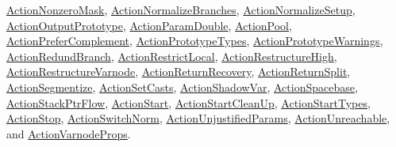 \mbox{\hyperlink{class_action_nonzero_mask}{Action\+Nonzero\+Mask}}, \mbox{\hyperlink{class_action_normalize_branches}{Action\+Normalize\+Branches}}, \mbox{\hyperlink{class_action_normalize_setup}{Action\+Normalize\+Setup}}, \mbox{\hyperlink{class_action_output_prototype}{Action\+Output\+Prototype}}, \mbox{\hyperlink{class_action_param_double}{Action\+Param\+Double}}, \mbox{\hyperlink{class_action_pool}{Action\+Pool}}, \mbox{\hyperlink{class_action_prefer_complement}{Action\+Prefer\+Complement}}, \mbox{\hyperlink{class_action_prototype_types}{Action\+Prototype\+Types}}, \mbox{\hyperlink{class_action_prototype_warnings}{Action\+Prototype\+Warnings}}, \mbox{\hyperlink{class_action_redund_branch}{Action\+Redund\+Branch}}, \mbox{\hyperlink{class_action_restrict_local}{Action\+Restrict\+Local}}, \mbox{\hyperlink{class_action_restructure_high}{Action\+Restructure\+High}}, \mbox{\hyperlink{class_action_restructure_varnode}{Action\+Restructure\+Varnode}}, \mbox{\hyperlink{class_action_return_recovery}{Action\+Return\+Recovery}}, \mbox{\hyperlink{class_action_return_split}{Action\+Return\+Split}}, \mbox{\hyperlink{class_action_segmentize}{Action\+Segmentize}}, \mbox{\hyperlink{class_action_set_casts}{Action\+Set\+Casts}}, \mbox{\hyperlink{class_action_shadow_var}{Action\+Shadow\+Var}}, \mbox{\hyperlink{class_action_spacebase}{Action\+Spacebase}}, \mbox{\hyperlink{class_action_stack_ptr_flow}{Action\+Stack\+Ptr\+Flow}}, \mbox{\hyperlink{class_action_start}{Action\+Start}}, \mbox{\hyperlink{class_action_start_clean_up}{Action\+Start\+Clean\+Up}}, \mbox{\hyperlink{class_action_start_types}{Action\+Start\+Types}}, \mbox{\hyperlink{class_action_stop}{Action\+Stop}}, \mbox{\hyperlink{class_action_switch_norm}{Action\+Switch\+Norm}}, \mbox{\hyperlink{class_action_unjustified_params}{Action\+Unjustified\+Params}}, \mbox{\hyperlink{class_action_unreachable}{Action\+Unreachable}}, and \mbox{\hyperlink{class_action_varnode_props}{Action\+Varnode\+Props}}.

